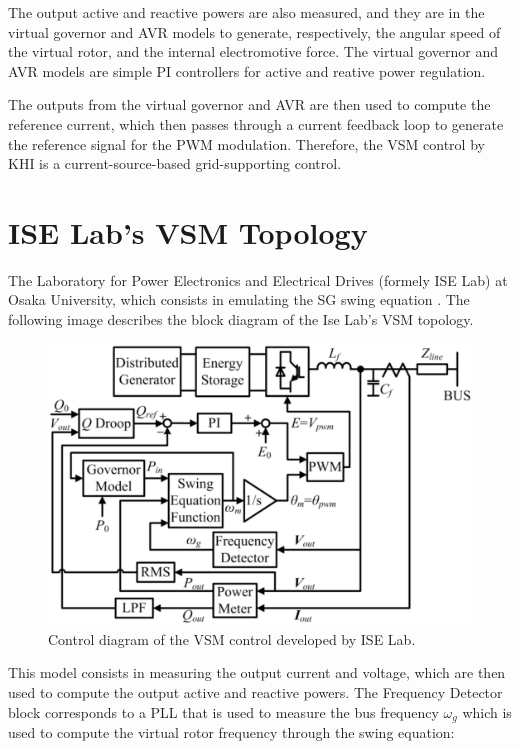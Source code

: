 The output active and reactive powers are also measured, and they are in the
virtual governor and AVR models to generate, respectively, the angular speed of
the virtual rotor, and the internal electromotive force. The virtual governor
and AVR models are simple PI controllers for active and reative power
regulation.

The outputs from the virtual governor and AVR are then used to compute the
reference current, which then passes through a current feedback loop to generate
the reference signal for the PWM modulation. Therefore, the VSM control by KHI
is a current-source-based grid-supporting control.

\section{ISE Lab's VSM Topology}
The Laboratory for Power Electronics and Electrical Drives (formely ISE Lab) at
Osaka University, which consists in emulating the SG swing equation
\cite{sakimoto2011stabilization,shintai2012reactive}. The following image
describes the block diagram of the Ise Lab's VSM topology.

\begin{figure}[ht!]
    \centering
    \includegraphics[width=14cm]{images/ISE.png}
    \caption{Control diagram of the VSM control developed by ISE Lab\cite{liu2016studies}.}
    \label{fig:ISE}
\end{figure}

This model consists in measuring the output current and voltage, which are then
used to compute the output active and reactive powers. The Frequency Detector
block corresponds to a PLL that is used to measure the bus frequency $\omega_g$
which is used to compute the virtual rotor frequency through the swing equation:

